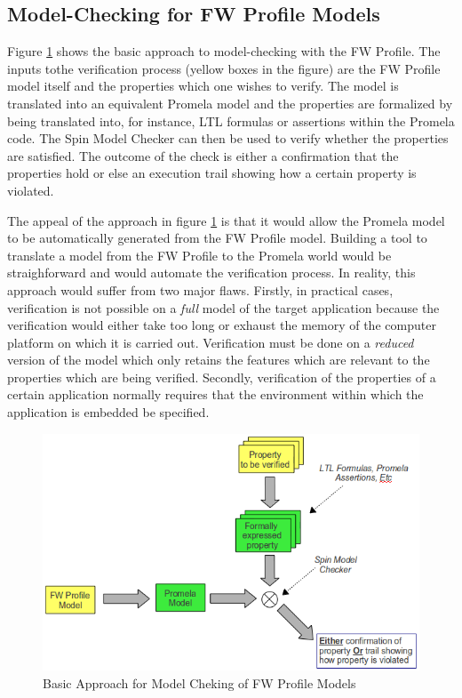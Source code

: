 \documentclass[a4paper,10pt]{article}
\begin{document}
\subsection{Model-Checking for FW Profile Models}
Figure \ref{fig:FV_BasicApproach} shows the basic approach to model-checking with the FW Profile. The inputs tothe verification process (yellow boxes in the figure) are the FW Profile model itself and the properties which one wishes to verify. The model is translated into an equivalent Promela model and the properties are formalized by being translated into, for instance, LTL formulas or assertions within the Promela code. The Spin Model Checker can then be used to verify whether the properties are satisfied. The outcome of the check is either a confirmation that the properties hold or else an execution trail showing how a certain property is violated.

The appeal of the approach in figure \ref{fig:FV_BasicApproach} is that it would allow the Promela model to be automatically generated from the FW Profile model. Building a tool to translate a model from the FW Profile to the Promela world would be straighforward and would automate the verification process. In reality, this approach would suffer from two major flaws. Firstly, in practical cases, verification is not possible on a \textit{full} model of the target application because the verification would either take too long or exhaust the memory of the computer platform on which it is carried out. Verification must be done on a \textit{reduced} version of the model which only retains the features which are relevant to the properties which are being verified. Secondly, verification of the properties of a certain application normally requires that the environment within which the application is embedded be specified. 

\begin{figure}[h]
 \centering
 \includegraphics[scale=0.45,keepaspectratio=true]{../images/FV_BasicApproach.png}
 \caption{Basic Approach for Model Cheking of FW Profile Models}
 \label{fig:FV_BasicApproach}
\end{figure}
\end{document}
